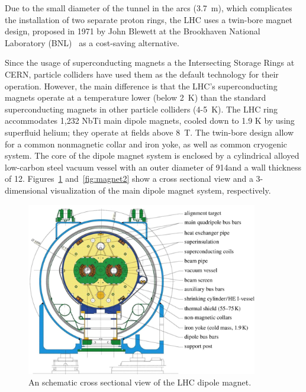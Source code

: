Due to the small diameter of the tunnel in the arcs
(3.7~m), which complicates the installation of two separate proton
rings, the LHC uses a twin-bore magnet design, proposed in 1971 by
John Blewett at the Brookhaven National Laboratory
(BNL)~\cite{JBlewett} as a cost-saving alternative. 

Since the usage of superconducting magnets a the Intersecting  Storage
Rings at CERN, particle colliders have used them as the default
technology for their operation. However, the main difference is that the LHC's
superconducting magnets operate at a temperature lower (below 2~K) than the
standard superconducting magnets in other particle colliders
(4-5~K). The LHC ring accommodates 1,232 NbTi main dipole magnets,
cooled down to 1.9 K by using superfluid helium; they operate at fields
above 8~T. The twin-bore design allow for a common nonmagnetic collar
and iron yoke, as well as common cryogenic system. The core of the
dipole magnet system is enclosed by a cylindrical alloyed low-carbon steel vacuum vessel with an outer diameter of 914\mm and a wall
thickness of 12\mm. Figures~\ref{fig:magnet1} and~\ref{fig:magnet2} show a cross sectional
view and a 3-dimensional visualization of the main dipole magnet
system, respectively.
\begin{figure}
 \centering
 \includegraphics[width=0.9\textwidth]{LHC_fig/ColdMassMagnet.jpg}
 \caption{An schematic cross sectional view of the LHC dipole magnet.\label{fig:magnet1} }
\end{figure}
